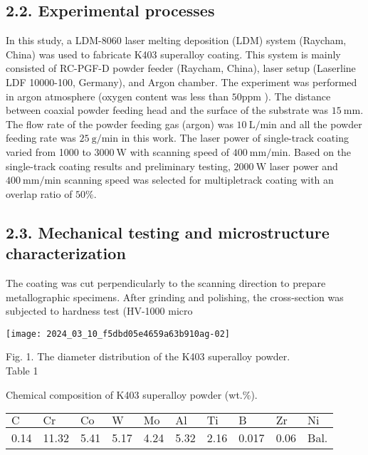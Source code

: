 \documentclass[10pt]{article}
\begin{document}
\subsection*{2.2. Experimental processes}
In this study, a LDM-8060 laser melting deposition (LDM) system (Raycham, China) was used to fabricate K403 superalloy coating. This system is mainly consisted of RC-PGF-D powder feeder (Raycham, China), laser setup (Laserline LDF 10000-100, Germany), and Argon chamber. The experiment was performed in argon atmosphere (oxygen content was less than $50 \mathrm{ppm}$ ). The distance between coaxial powder feeding head and the surface of the substrate was $15 \mathrm{~mm}$. The flow rate of the powder feeding gas (argon) was $10 \mathrm{~L} / \mathrm{min}$ and all the powder feeding rate was $25 \mathrm{~g} / \mathrm{min}$ in this work. The laser power of single-track coating varied from 1000 to $3000 \mathrm{~W}$ with scanning speed of $400 \mathrm{~mm} / \mathrm{min}$. Based on the single-track coating results and preliminary testing, $2000 \mathrm{~W}$ laser power and $400 \mathrm{~mm} / \mathrm{min}$ scanning speed was selected for multipletrack coating with an overlap ratio of $50 \%$.

\subsection*{2.3. Mechanical testing and microstructure characterization}
The coating was cut perpendicularly to the scanning direction to prepare metallographic specimens. After grinding and polishing, the cross-section was subjected to hardness test (HV-1000 micro

\begin{center}
\texttt{[image: 2024\_03\_10\_f5dbd05e4659a63b910ag-02]}
\end{center}

Fig. 1. The diameter distribution of the K403 superalloy powder.\\
Table 1

Chemical composition of K403 superalloy powder (wt.\%).

\begin{center}
\begin{tabular}{llllllllll}
\hline
$\mathrm{C}$ & $\mathrm{Cr}$ & $\mathrm{Co}$ & $\mathrm{W}$ & $\mathrm{Mo}$ & $\mathrm{Al}$ & $\mathrm{Ti}$ & $\mathrm{B}$ & $\mathrm{Zr}$ & $\mathrm{Ni}$ \\
\hline
0.14 & 11.32 & 5.41 & 5.17 & 4.24 & 5.32 & 2.16 & 0.017 & 0.06 & Bal. \\
\hline
\end{tabular}
\end{center}
\end{document}
